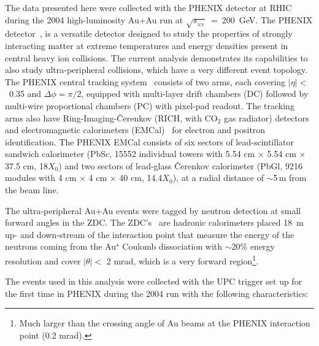 \documentclass[dvipdfm]{elsart}
\newcommand{\sqrtsnn}{\sqrt{s_{_{NN}}}}
\begin{document}
The data presented here were collected with the PHENIX detector at RHIC 
during the 2004 high-luminosity Au+Au run at $\sqrtsnn$~=~200~GeV. 
The PHENIX detector~\cite{Adcox:2003zm}, is a versatile detector designed to 
study the properties of strongly interacting matter at extreme temperatures 
and energy densities present in central heavy ion collisions. The current 
analysis demonstrates its capabilities to also study ultra-peripheral 
collisions, which have a very different event topology. The PHENIX central 
tracking system~\cite{Adcox:2003_ca} consists of two arms, each covering 
$| \eta | <$~0.35 and $\Delta \phi = \pi/2$, equipped with multi-layer drift 
chambers (DC) followed by multi-wire proportional chambers (PC) with 
pixel-pad readout. The tracking arms also have Ring-Imaging-\v{C}erenkov 
(RICH, with CO$_{2}$ gas radiator) detectors~\cite{Aizawa:2003} and 
electromagnetic calorimeters (EMCal)~\cite{Aphecetche:2003zr} for electron 
and positron identification. The PHENIX EMCal consists of six sectors of 
lead-scintillator sandwich calorimeter (PbSc, 15552 individual towers with 
5.54 cm $\times$ 5.54 cm $\times$ 37.5 cm, 18$X_0$) and two sectors of 
lead-glass \v{C}erenkov calorimeter (PbGl, 9216 modules with 4 cm $\times$ 4 
cm $\times$ 40 cm, 14.4$X_0$), at a radial distance of $\sim$5\,m from the 
beam line.

The ultra-peripheral Au+Au events were tagged by neutron detection 
at small forward angles in the ZDC. The 
ZDC's~\cite{Adler:2000bd,Chiu:2001ij} are hadronic calorimeters placed 
18~m up- and down-stream of the interaction point that measure the energy of 
the neutrons coming from the Au$^\star$ Coulomb dissociation with $\sim$20\% 
energy resolution and cover $|\theta|<$ 2 mrad, which is a very forward 
region\footnote{Much larger than the crossing angle of Au beams at the 
PHENIX interaction point (0.2 mrad).}.

The events used in this analysis were collected with the UPC trigger set up 
for the first time in PHENIX during the 2004 run with the following 
characteristics:
\end{document}
